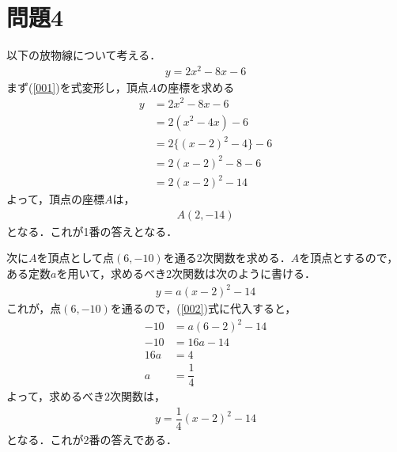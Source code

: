 \documentclass[12pt]{jarticle}
\date{}
\begin{document}
\section*{問題4}
以下の放物線について考える．
\begin{align}
\label{001}
y = 2x^2 -8x -6
\end{align}
まず(\ref{001})を式変形し，頂点$A$の座標を求める
\begin{align*}
y &= 2x^2 - 8x -6 \\
&= 2 (x^2 - 4x) - 6 \\
&= 2 \{(x-2)^2-4\} - 6 \\
&= 2 (x-2)^2 - 8 - 6 \\
&= 2 (x-2)^2 -14
\end{align*}
よって，頂点の座標$A$は，
\begin{align*}
A(2,-14)
\end{align*}
となる．これが1番の答えとなる．

次に$A$を頂点として点$(6,-10)$を通る2次関数を求める．$A$を頂点とするので，ある定数$a$を用いて，求めるべき2次関数は次のように書ける．
\begin{align}
\label{002}
y = a(x-2)^2 - 14
\end{align}
これが，点$(6,-10)$を通るので，(\ref{002})式に代入すると，
\begin{align*}
-10 &= a(6-2)^2 -14 \\
-10 &=16a -14 \\
16a &= 4 \\
a&= \dfrac{1}{4}
\end{align*}
よって，求めるべき2次関数は，
\begin{align*}
y = \dfrac{1}{4} (x-2)^2 -14
\end{align*}
となる．これが2番の答えである．
%
\end{document}
